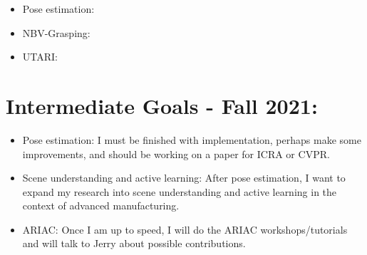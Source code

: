 \documentclass[11pt]{article}
\begin{document}
\begin{itemize}
      \item Pose estimation:
      \item NBV-Grasping:
      \item UTARI:
\end{itemize}

\section{Intermediate Goals - Fall 2021:}
\begin{itemize}
      \item Pose estimation: I must be finished with implementation, perhaps make some improvements, and should be working on a paper for ICRA or CVPR.
      \item Scene understanding and active learning: After pose estimation, I want to expand my research into scene understanding and active learning in the context of advanced manufacturing.
      \item ARIAC: Once I am up to speed, I will do the ARIAC workshops/tutorials and will talk to Jerry about possible contributions.
\end{itemize}


\newpage


\end{document}
